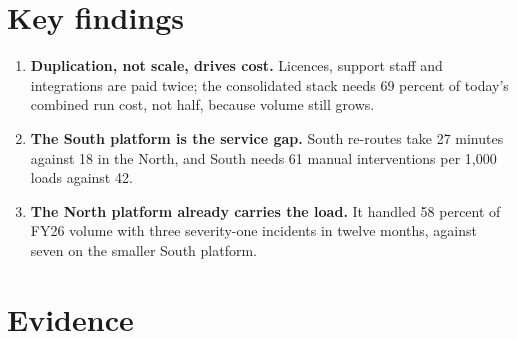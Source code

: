 \section{Key findings}

\begin{exhibitgrid}[columns=3]
\end{exhibitgrid}

\begin{enumerate}
  \item \textbf{Duplication, not scale, drives cost.} Licences, support staff
    and integrations are paid twice; the consolidated stack needs 69 percent
    of today's combined run cost, not half, because volume still grows.
  \item \textbf{The South platform is the service gap.} South re-routes take
    27 minutes against 18 in the North, and South needs 61 manual
    interventions per 1{,}000 loads against 42.
  \item \textbf{The North platform already carries the load.} It handled 58
    percent of FY26 volume with three severity-one incidents in twelve
    months, against seven on the smaller South platform.
\end{enumerate}

\section{Evidence}


